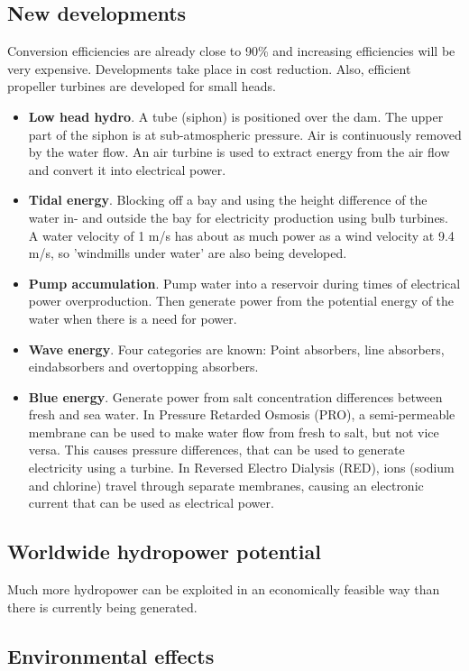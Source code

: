 \documentclass[a4paper,10pt]{article}
\begin{document}
\subsection{New developments}
Conversion efficiencies are already close to 90\% and increasing efficiencies will be very expensive. Developments take place in cost reduction. Also, efficient propeller turbines are developed for small heads.
\begin{itemize}
\item \textbf{Low head hydro}. A tube (siphon) is positioned over the dam. The upper part of the siphon is at sub-atmospheric pressure. Air is continuously removed by the water flow. An air turbine is used to extract energy from the air flow and convert it into electrical power.
\item \textbf{Tidal energy}. Blocking off a bay and using the height difference of the water in- and outside the bay for electricity production using bulb turbines. A water velocity of 1 m/s has about as much power as a wind velocity at 9.4 m/s, so 'windmills under water' are also being developed.
\item \textbf{Pump accumulation}. Pump water into a reservoir during times of electrical power overproduction. Then generate power from the potential energy of the water when there is a need for power.
\item \textbf{Wave energy}. Four categories are known: Point absorbers, line absorbers, eindabsorbers and overtopping absorbers.
\item \textbf{Blue energy}. Generate power from salt concentration differences between fresh and sea water. In Pressure Retarded Osmosis (PRO), a semi-permeable membrane can be used to make water flow from fresh to salt, but not vice versa. This causes pressure differences, that can be used to generate electricity using a turbine. In Reversed Electro Dialysis (RED), ions (sodium and chlorine) travel through separate membranes, causing an electronic current that can be used as electrical power. 
\end{itemize}

\subsection{Worldwide hydropower potential}
Much more hydropower can be exploited in an economically feasible way than there is currently being generated. 

\subsection{Environmental effects}
\end{document}
